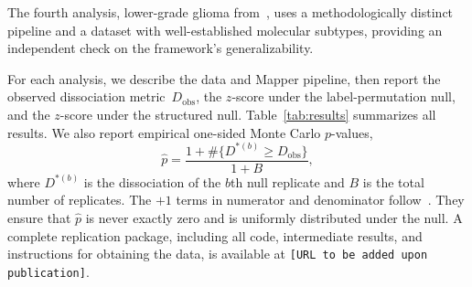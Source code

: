\documentclass[hidelinks]{siamart251216}
\begin{document}
The fourth analysis, lower-grade glioma from~\cite{RabadanCamara2020},
uses a methodologically distinct pipeline and a dataset with
well-established molecular subtypes, providing an independent check on
the framework's generalizability.

For each analysis, we describe the data and Mapper pipeline, then
report the observed dissociation metric~$D_{\mathrm{obs}}$, the
$z$-score under the label-permutation null, and the $z$-score under
the structured null.  Table~\ref{tab:results} summarizes all results.
We also report empirical one-sided Monte Carlo $p$-values,
\begin{equation}\label{eq:mc-pvalue}
  \hat{p} = \frac{1 + \#\{D^{*(b)} \ge D_{\mathrm{obs}}\}}{1 + B},
\end{equation}
where $D^{*(b)}$ is the dissociation of the $b$th null replicate and
$B$ is the total number of replicates.  The $+1$ terms in numerator
and denominator follow~\cite{Davison1997}.  They ensure that
$\hat{p}$ is never exactly zero and is uniformly distributed under
the null.
A complete replication package, including all code, intermediate
results, and instructions for obtaining the data, is available at
\texttt{[URL to be added upon publication]}.
\end{document}
